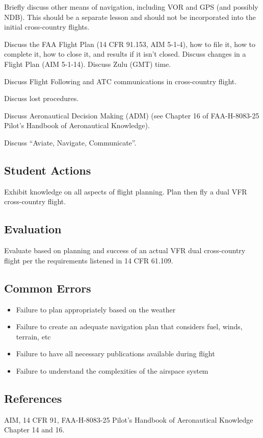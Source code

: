 Briefly discuss other means of navigation, including VOR and GPS (and possibly
NDB). This should be a separate lesson and should not be incorporated into the
initial cross-country flights.

Discuss the FAA Flight Plan (14 CFR 91.153, AIM 5-1-4), how to file it, how to
complete it, how to close it, and results if it isn’t closed. Discuss changes
in a Flight Plan (AIM 5-1-14). Discuss Zulu (GMT) time.

Discuss Flight Following and ATC communications in cross-country flight.

Discuss lost procedures.

Discuss Aeronautical Decision Making (ADM) (see Chapter 16 of FAA-H-8083-25
Pilot's Handbook of Aeronautical Knowledge).

Discuss ``Aviate, Navigate, Communicate''.

\subsection{Student Actions}

Exhibit knowledge on all aspects of flight planning. Plan then fly a dual VFR
cross-country flight.

\subsection{Evaluation}

Evaluate based on planning and success of an actual VFR dual cross-country
flight per the requirements listened in 14 CFR 61.109.

\subsection{Common Errors}

\begin{itemize}
  \item Failure to plan appropriately based on the weather
  \item Failure to create an adequate navigation plan that considers fuel,
    winds, terrain, etc
  \item Failure to have all necessary publications available during flight
  \item Failure to understand the complexities of the airspace system
\end{itemize}

\subsection{References}

AIM, 14 CFR 91, FAA-H-8083-25 Pilot's Handbook of Aeronautical Knowledge
Chapter 14 and 16.

